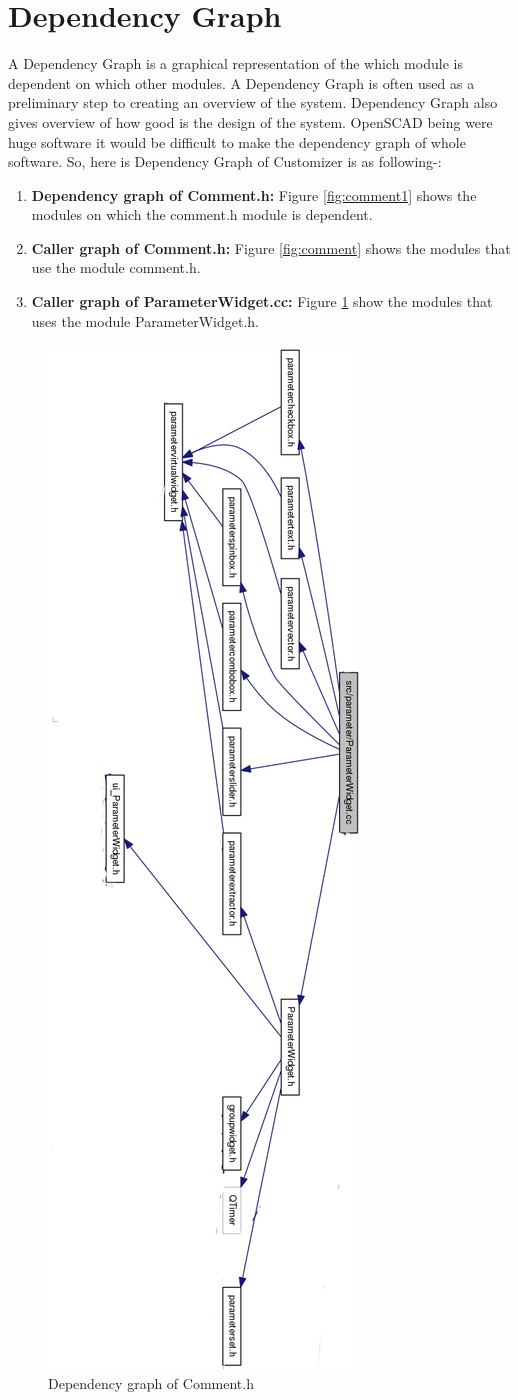 \section{Dependency Graph}
A Dependency Graph is a graphical representation of the which module is dependent on which other modules. A Dependency Graph is often used as a preliminary step to creating an overview of the system. Dependency Graph also gives overview of how good is the design of the system.
OpenSCAD being were huge software it would be difficult to make the dependency graph of whole software. So, here is  Dependency Graph of Customizer is as following-:
\begin{enumerate}
\item \textbf{Dependency graph of Comment.h:} Figure \ref{fig:comment1} shows the modules on which the comment.h module is dependent.
\item \textbf{Caller graph of Comment.h:} Figure \ref{fig:comment} shows the modules that use the module comment.h.
\item \textbf{Caller graph of ParameterWidget.cc:} Figure \ref{fig:dependency} show the modules that uses the module ParameterWidget.h.
\end{enumerate}

\begin{figure}
	\centering
	\includegraphics[width=0.7\linewidth,height=1.37\columnwidth]{images/dependene}
	\caption{ Dependency graph of Comment.h}
	\label{fig:dependency}
\end{figure}

